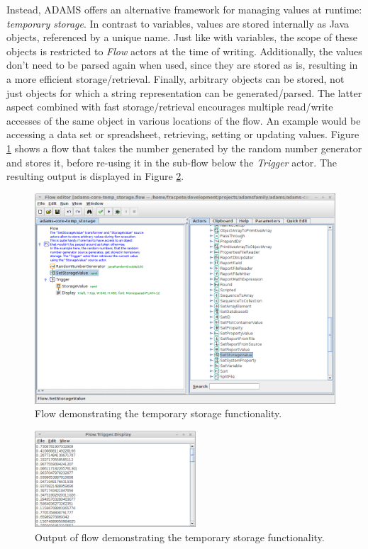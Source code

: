 Instead, ADAMS offers an alternative framework for managing values at runtime:
\textit{temporary storage}. In contrast to variables, values are stored
internally as Java objects, referenced by a unique name. Just like with
variables, the scope of these objects is restricted to \textit{Flow} actors at
the time of writing. Additionally, the values don't need to be parsed again
when used, since they are stored as is, resulting in a more efficient
storage/retrieval. Finally, arbitrary objects can be stored, not just objects
for which a string representation can be generated/parsed. The latter aspect
combined with fast storage/retrieval encourages multiple read/write accesses of
the same object in various locations of the flow. An example would be accessing
a data set or spreadsheet, retrieving, setting or updating values. Figure
\ref{floweditor-storage1_flow} shows a flow that takes the number generated by
the random number generator and stores it, before re-using it in the sub-flow
below the \textit{Trigger} actor. The resulting output is displayed in Figure
\ref{floweditor-storage1_output}.

\begin{figure}[htb]
  \centering
  \includegraphics[width=12.0cm]{images/floweditor-storage1_flow.png}
  \caption{Flow demonstrating the temporary storage functionality.}
  \label{floweditor-storage1_flow}
\end{figure}

\begin{figure}[htb]
  \centering
  \includegraphics[width=6.0cm]{images/floweditor-storage1_output.png}
  \caption{Output of flow demonstrating the temporary storage
  functionality.}
  \label{floweditor-storage1_output}
\end{figure}

